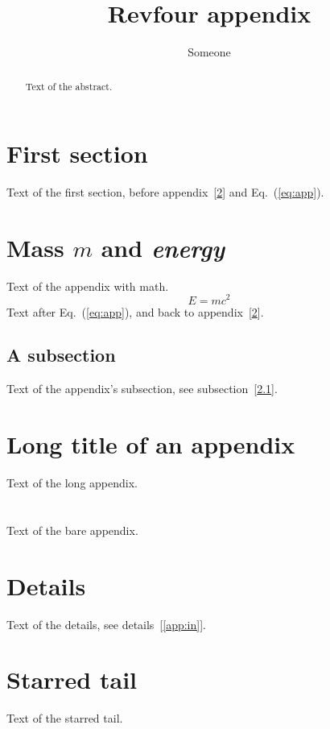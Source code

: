 \documentclass{revtex4}
\begin{document}
\title{Revfour appendix}
\author{Someone}
\begin{abstract}
Text of the abstract.
\end{abstract}
\maketitle
\section{First section}\label{sec:first}
Text of the first section, before appendix~[\ref{app:math}] and
Eq.~(\ref{eq:app}).
\appendix*
\section{Mass $m$ and \emph{energy}}\label{app:math}
Text of the appendix with math.
\begin{equation}
E = m c^2 \label{eq:app}
\end{equation}
Text after Eq.~(\ref{eq:app}), and back to appendix~[\ref{app:math}].
\subsection{A subsection}\label{app:sub}
Text of the appendix's subsection, see subsection~[\ref{app:sub}].
\section[Short]{Long title of an appendix}
Text of the long appendix.
\section{}
Text of the bare appendix.
\section{Details\label{app:in}}
Text of the details, see details~[\ref{app:in}].
\section*{Starred tail}
Text of the starred tail.
\end{document}
